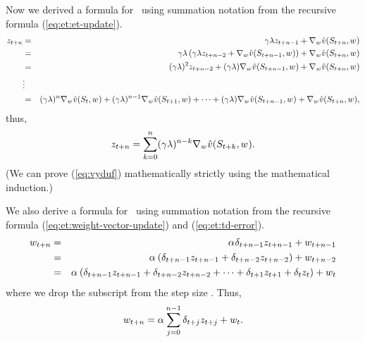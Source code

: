 Now we derived a formula for \ using summation notation from the recursive formula (\ref{eq:et:et-update}).
\begin{eqnarray*}
z_{t+n} &=& \gamma \lambda z_{t+n-1} + \nabla_{{w_{}}} \hat{v}(S_{t+n},{w_{}})
\\
&=& \gamma \lambda \left(
\gamma \lambda z_{t+n-2} + \nabla_{{w_{}}} \hat{v}(S_{t+n-1},{w_{}})
\right)
+ \nabla_{{w_{}}} \hat{v}(S_{t+n},{w_{}})
\\
&=& (\gamma \lambda )^2 z_{t+n-2} + (\gamma \lambda) \nabla_{{w_{}}} \hat{v}(S_{t+n-1},{w_{}})
+ \nabla_{{w_{}}} \hat{v}(S_{t+n},{w_{}})
\\
&\vdots&
\\
&=& (\gamma \lambda )^{n} \nabla_{{w_{}}} \hat{v}(S_{t},{w_{}})
+ (\gamma \lambda)^{n-1} \nabla_{{w_{}}} \hat{v}(S_{t+1},{w_{}})
+ \cdots
+ (\gamma \lambda) \nabla_{{w_{}}} \hat{v}(S_{t+n-1},{w_{}})
+ \nabla_{{w_{}}} \hat{v}(S_{t+n},{w_{}}),
\end{eqnarray*}
thus,
\begin{equation}
\label{eq:vyduf}
z_{t+n} = \sum_{k=0}^n (\gamma \lambda)^{n-k} \nabla_{{w_{}}} \hat{v}(S_{t+k},{w_{}}).
\end{equation}
(We can prove (\ref{eq:vyduf}) mathematically strictly using the mathematical induction.)

We also derive a formula for \ using summation notation from the recursive formula (\ref{eq:et:weight-vector-update})
and (\ref{eq:et:td-error}).
\begin{eqnarray*}
{w_{t+n}} &=& \alpha_{} \delta_{t+n-1} z_{t+n-1} + {w_{t+n-1}}
\\
&=& \alpha_{} \left( \delta_{t+n-1} z_{t+n-1} + \delta_{t+n-2} z_{t+n-2} \right) + {w_{t+n-2}}
\\
&=& \alpha_{} \left(
\delta_{t+n-1} z_{t+n-1} + \delta_{t+n-2} z_{t+n-2} + \cdots + \delta_{t+1} z_{t+1} + \delta_{t} z_{t}
\right)
+ {w_{t}}
\end{eqnarray*}
where we drop the subscript from the step size .
Thus,
\begin{equation}
\label{eq:nuasdk}
{w_{t+n}} = \alpha_{} \sum_{j=0}^{n-1}  \delta_{t+j} z_{t+j} + {w_{t}}.
\end{equation}

